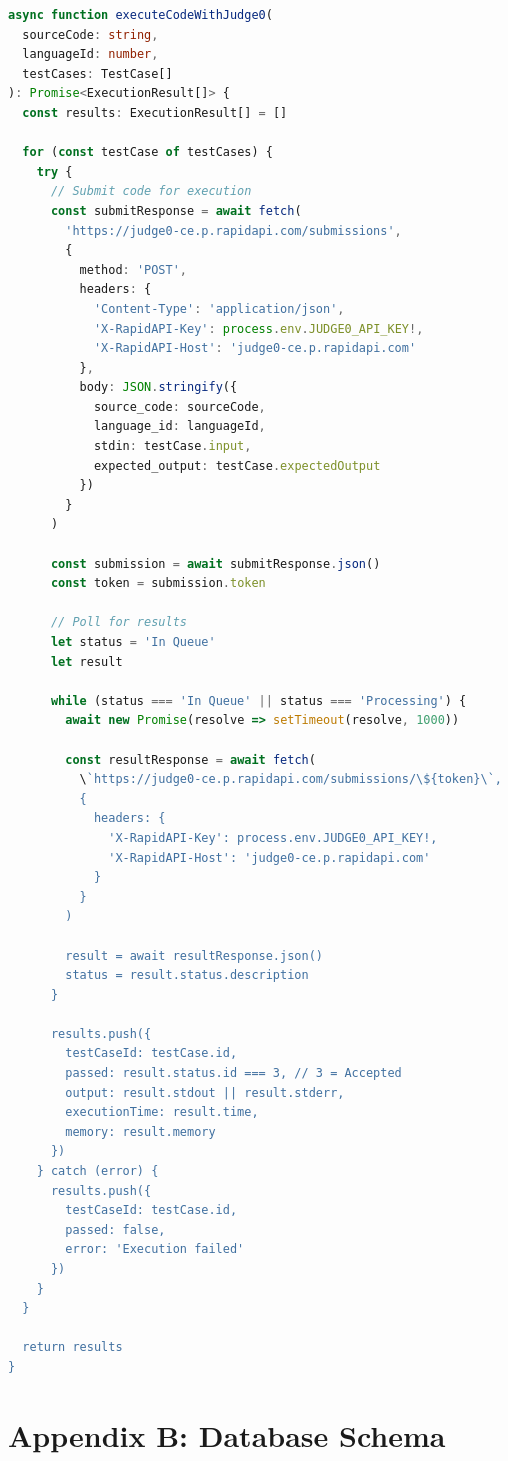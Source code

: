 \begin{lstlisting}[language=TypeScript, caption=Code Execution Function]
async function executeCodeWithJudge0(
  sourceCode: string,
  languageId: number,
  testCases: TestCase[]
): Promise<ExecutionResult[]> {
  const results: ExecutionResult[] = []
  
  for (const testCase of testCases) {
    try {
      // Submit code for execution
      const submitResponse = await fetch(
        'https://judge0-ce.p.rapidapi.com/submissions',
        {
          method: 'POST',
          headers: {
            'Content-Type': 'application/json',
            'X-RapidAPI-Key': process.env.JUDGE0_API_KEY!,
            'X-RapidAPI-Host': 'judge0-ce.p.rapidapi.com'
          },
          body: JSON.stringify({
            source_code: sourceCode,
            language_id: languageId,
            stdin: testCase.input,
            expected_output: testCase.expectedOutput
          })
        }
      )
      
      const submission = await submitResponse.json()
      const token = submission.token
      
      // Poll for results
      let status = 'In Queue'
      let result
      
      while (status === 'In Queue' || status === 'Processing') {
        await new Promise(resolve => setTimeout(resolve, 1000))
        
        const resultResponse = await fetch(
          \`https://judge0-ce.p.rapidapi.com/submissions/\${token}\`,
          {
            headers: {
              'X-RapidAPI-Key': process.env.JUDGE0_API_KEY!,
              'X-RapidAPI-Host': 'judge0-ce.p.rapidapi.com'
            }
          }
        )
        
        result = await resultResponse.json()
        status = result.status.description
      }
      
      results.push({
        testCaseId: testCase.id,
        passed: result.status.id === 3, // 3 = Accepted
        output: result.stdout || result.stderr,
        executionTime: result.time,
        memory: result.memory
      })
    } catch (error) {
      results.push({
        testCaseId: testCase.id,
        passed: false,
        error: 'Execution failed'
      })
    }
  }
  
  return results
}
\end{lstlisting}

\section{Appendix B: Database Schema}

